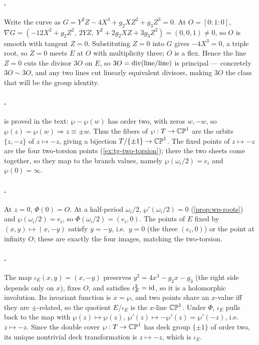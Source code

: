 \paragraph{.}
Write the curve as \(G = Y^2 Z - 4X^3 + g_2 X Z^2 + g_3 Z^3 = 0\). At
\(O = [0:1:0]\), \(\nabla G = (-12X^2 + g_2 Z^2,\ 2YZ,\ Y^2 + 2g_2 XZ + 3g_3 Z^2)
= (0, 0, 1) \ne 0\), so \(O\) is smooth with tangent \(Z = 0\). Substituting
\(Z = 0\) into \(G\) gives \(-4X^3 = 0\), a triple root, so \(Z = 0\) meets \(E\)
at \(O\) with multiplicity three; \(O\) is a flex. Hence the line \(Z = 0\) cuts
the divisor \(3O\) on \(E\), so \(3O = \operatorname{div}(\text{line}/\text{line})\) is
principal --- concretely \(3O \sim 3O\), and any two lines cut linearly equivalent
divisors, making \(3O\) the class that will be the group identity.

\paragraph{.}
 is proved in the text: \(\wp - \wp(w)\) has order two, with
zeros \(w, -w\), so \(\wp(z) = \wp(w) \Rightarrow z \equiv \pm w\). Thus the fibers
of \(\wp : T \to \mathbb{CP}^1\) are the orbits \(\{z, -z\}\) of \(z \mapsto -z\), giving a
bijection \(T/\{\pm1\} \to \mathbb{CP}^1\). The fixed points of \(z \mapsto -z\) are the
four two-torsion points (\cref{ex:tg-two-torsion}); there the two sheets come
together, so they map to the branch values, namely \(\wp(\omega_i/2) = e_i\) and
\(\wp(0) = \infty\).

\paragraph{.}
At \(z = 0\), \(\Phi(0) = O\). At a half-period \(\omega_i/2\), \(\wp'(\omega_i/2)
= 0\) (\cref{prop:wp-roots}) and \(\wp(\omega_i/2) = e_i\), so
\(\Phi(\omega_i/2) = (e_i, 0)\). The points of \(E\) fixed by \((x,y) \mapsto
(x,-y)\) satisfy \(y = -y\), i.e.\ \(y = 0\) (the three \((e_i, 0)\)) or the point
at infinity \(O\); these are exactly the four images, matching the two-torsion.

\paragraph{.}
The map \(\iota_E(x,y) = (x,-y)\) preserves \(y^2 = 4x^3 - g_2 x - g_3\) (the
right side depends only on \(x\)), fixes \(O\), and satisfies \(\iota_E^2 = \operatorname{id}\),
so it is a holomorphic involution. Its invariant function is \(x = \wp\), and two
points share an \(x\)-value iff they are \(\pm\)-related, so the quotient
\(E/\iota_E\) is the \(x\)-line \(\mathbb{CP}^1\). Under \(\Phi\), \(\iota_E\) pulls back to
the map with \(\wp(z) \mapsto \wp(z)\), \(\wp'(z) \mapsto -\wp'(z) = \wp'(-z)\),
i.e.\ \(z \mapsto -z\). Since the double cover \(\wp : T \to \mathbb{CP}^1\) has deck group
\(\{\pm1\}\) of order two, its unique nontrivial deck transformation is
\(z \mapsto -z\), which is \(\iota_E\).

